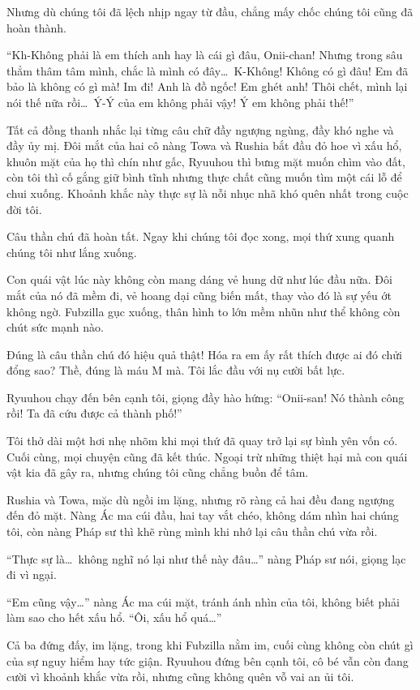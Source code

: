 \documentclass[../main.tex]{subfiles}
\begin{document}
Nhưng dù chúng tôi đã lệch nhịp ngay từ đầu, chẳng mấy chốc chúng tôi cũng đã hoàn thành.

``Kh-Không phải là em thích anh hay là cái gì đâu, Onii-chan! Nhưng trong sâu thẳm thâm tâm mình, chắc là mình có đây\dots\ K-Không! Không có gì đâu! Em đã bảo là không có gì mà! Im đi! Anh là đồ ngốc! Em ghét anh! Thôi chết, mình lại nói thế nữa rồi\dots\ Ý-Ý của em không phải vậy! Ý em không phải thế!''

Tất cả đồng thanh nhắc lại từng câu chữ đầy ngượng ngùng, đầy khó nghe và đầy ủy mị. Đôi mắt của hai cô nàng Towa và Rushia bắt đầu đỏ hoe vì xấu hổ, khuôn mặt của họ thì chín như gấc, Ryuuhou thì bưng mặt muốn chìm vào đất, còn tôi thì cố gắng giữ bình tĩnh nhưng thực chất cũng muốn tìm một cái lỗ để chui xuống. Khoảnh khắc này thực sự là nỗi nhục nhã khó quên nhất trong cuộc đời tôi.

Câu thần chú đã hoàn tất. Ngay khi chúng tôi đọc xong, mọi thứ xung quanh chúng tôi như lắng xuống.

Con quái vật lúc này không còn mang dáng vẻ hung dữ như lúc đầu nữa. Đôi mắt của nó đã mềm đi, vẻ hoang dại cũng biến mất, thay vào đó là sự yếu ớt không ngờ. Fubzilla gục xuống, thân hình to lớn mềm nhũn như thể không còn chút sức mạnh nào.

Đúng là câu thần chú đó hiệu quả thật! Hóa ra em ấy rất thích được ai đó chửi đổng sao? Thề, đúng là máu M mà. Tôi lắc đầu với nụ cười bất lực.

Ryuuhou chạy đến bên cạnh tôi, giọng đầy hào hứng: ``Onii-san! Nó thành công rồi! Ta đã cứu được cả thành phố!''

Tôi thở dài một hơi nhẹ nhõm khi mọi thứ đã quay trở lại sự bình yên vốn có. Cuối cùng, mọi chuyện cũng đã kết thúc. Ngoại trừ những thiệt hại mà con quái vật kia đã gây ra, nhưng chúng tôi cũng chẳng buồn để tâm.

Rushia và Towa, mặc dù ngồi im lặng, nhưng rõ ràng cả hai đều đang ngượng đến đỏ mặt. Nàng Ác ma cúi đầu, hai tay vắt chéo, không dám nhìn hai chúng tôi, còn nàng Pháp sư thì khẽ rùng mình khi nhớ lại câu thần chú vừa rồi.

``Thực sự là\dots\ không nghĩ nó lại như thế này đâu\dots'' nàng Pháp sư nói, giọng lạc đi vì ngại.

``Em cũng vậy\dots'' nàng Ác ma cúi mặt, tránh ánh nhìn của tôi, không biết phải làm sao cho hết xấu hổ. ``Ôi, xấu hổ quá\dots''

Cả ba đứng đấy, im lặng, trong khi Fubzilla nằm im, cuối cùng không còn chút gì của sự nguy hiểm hay tức giận. Ryuuhou đứng bên cạnh tôi, cô bé vẫn còn đang cười vì khoảnh khắc vừa rồi, nhưng cũng không quên vỗ vai an ủi tôi.
\end{document}
